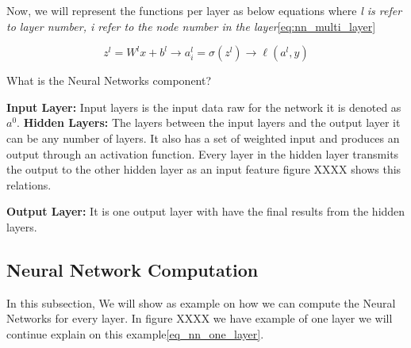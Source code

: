  Now, we will represent the functions per layer as below equations where \textit{l is refer to layer number, i refer to the node number in the layer}\eqref{eq:nn_multi_layer}
 
\begin{equation}\label{eq:nn_multi_layer}
  \boxed{z^l =  W^l x + b^l} \longrightarrow \boxed{a_i^l =  \sigma(z^l)} \longrightarrow \boxed{\ell(a^l,y)}
\end{equation}

What is the Neural Networks component?

\textbf{Input Layer:} Input layers is the input data raw for the network it is denoted as $a^0$.
\textbf{Hidden Layers:} The layers between the input layers and the output layer it can be any number of layers. It also has a set of weighted input and produces an output through an activation function. Every layer in the hidden layer transmits the output to the other hidden layer as an input feature figure XXXX shows this relations. %

\textbf{Output Layer:} It is one output layer with have the final results from the hidden layers.

 \subsection{Neural Network Computation}
 In this subsection, We will show as example on how we can compute the Neural Networks for every layer. In figure XXXX we have example of one layer we will continue explain on this example\eqref{eq_nn_one_layer}.

